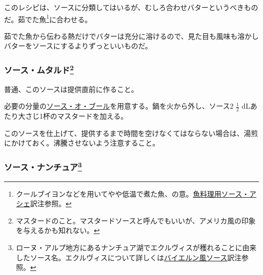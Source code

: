 \begin{recette}
このレシピは、ソースに分類してはいるが、むしろ合わせバターというべきものだ。茹でた魚\footnote{クールブイヨンなどを用いてやや低温で煮た魚、の意。\protect\hyperlink{sauce-hachee-maigre}{魚料理用ソース・アシェ}訳注参照。}に合わせる。

茹でた魚から伝わる熱だけでバターは充分に溶けるので、見た目も風味も溶かしバターをソースにするよりずっといいものだ。

\atoaki{}

\hypertarget{sauce-moutarde}{%
\subsubsection[ソース・ムタルド]{\texorpdfstring{ソース・ムタルド\footnote{マスタードのこと。マスタードソースと呼んでもいいが、アメリカ風の印象を与えるかも知れない。}}{ソース・ムタルド}}\label{sauce-moutarde}}


 

普通、このソースは提供直前に作ること。

必要の分量の\protect\hyperlink{sauce-au-beurre}{ソース・オ・ブール}を用意する。鍋を火から外し、ソース2
\(\frac{1}{2}\) dLあたり大さじ1杯のマスタードを加える。

このソースを仕上げて、提供するまで時間を空けなくてはならない場合は、湯煎にかけておく。沸騰させないよう注意すること。

\atoaki{}

\hypertarget{sauce-nantua}{%
\subsubsection[ソース・ナンチュア]{\texorpdfstring{ソース・ナンチュア\footnote{ローヌ・アルプ地方にあるナンチュア湖でエクルヴィスが穫れることに由来したソース名。エクルヴィスについて詳しくは\protect\hyperlink{sauce-bavaroise}{バイエルン風ソース}訳注参照。}}{ソース・ナンチュア}}\label{sauce-nantua}}


 


\end{recette}
